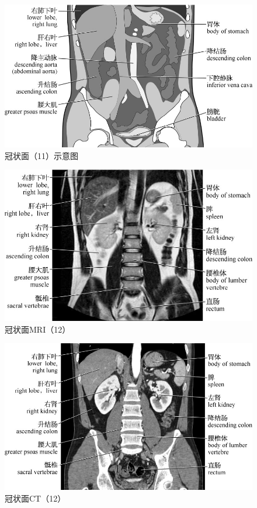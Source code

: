 \begin{figure}[!htbp]
 \centering
 \includegraphics{./images/Image00124.jpg}
 \captionsetup{justification=centering}
 \caption{冠状面（11）示意图}
  \end{figure} 
 \FloatBarrier

\begin{figure}[!htbp]
 \centering
 \includegraphics{./images/Image00125.jpg}
 \captionsetup{justification=centering}
 \caption{冠状面MRI（12）}
  \end{figure} 
 \FloatBarrier

\begin{figure}[!htbp]
 \centering
 \includegraphics{./images/Image00126.jpg}
 \captionsetup{justification=centering}
 \caption{冠状面CT（12）}
  \end{figure} 
 \FloatBarrier


